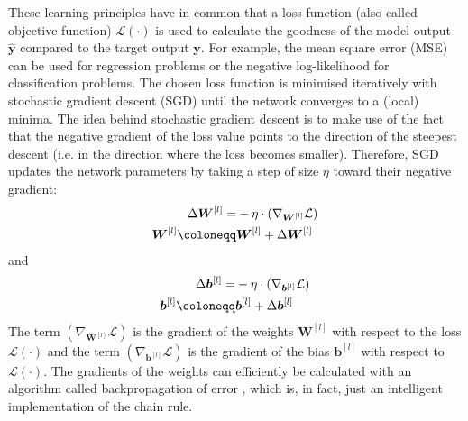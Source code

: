 These learning principles have in common that a loss function (also called objective function) $\mathcal{L}(\cdot)$ is used to calculate the goodness of the model output $\boldsymbol{\hat{y}}$ compared to the target output ${\boldsymbol{y}}$. For example, the mean square error (MSE) can be used for regression problems or the negative log-likelihood for classification problems.
The chosen loss function is minimised iteratively with stochastic gradient descent (SGD) until the network converges to a (local) minima.
The idea behind stochastic gradient descent is to make use of the fact that the negative gradient of the loss value points to the direction of the steepest descent (i.e. in the direction where the loss becomes smaller).
Therefore, SGD updates the network parameters by taking a step of size $\eta$ toward their negative gradient:
%
\begin{align}\eqlbl{sgd}
	\begin{aligned}
		\Delta \boldsymbol{W}^{[l]} = & -\eta \cdot \left( \nabla_{\boldsymbol{W}^{[l]}} \mathcal{L} \right)\\
		\boldsymbol{W}^{[l]} \coloneqq & \boldsymbol{W}^{[l]} + \Delta \boldsymbol{W}^{[l]}
	\end{aligned}
\end{align}
%
and
%	
\begin{align}\eqlbl{sgd2}	
	\begin{aligned}
		\Delta \boldsymbol{b}^{[l]} = & -\eta \cdot \left( \nabla_{\boldsymbol{b}^{[l]}} \mathcal{L} \right)\\
		\boldsymbol{b}^{[l]} \coloneqq & \boldsymbol{b}^{[l]} + \Delta \boldsymbol{b}^{[l]}
	\end{aligned}
\end{align}
%
The term $\left( \nabla_{\boldsymbol{W}^{[l]}} \mathcal{L} \right)$ is the gradient of the weights \(\boldsymbol{W}^{[l]}\)  with respect to the loss $\mathcal{L}(\cdot)$ and the term $\left( \nabla_{\boldsymbol{b}^{[l]}} \mathcal{L} \right)$ is the gradient of the bias \(\boldsymbol{b}^{[l]}\)  with respect to $\mathcal{L}(\cdot)$.
The gradients of the weights can efficiently be calculated with an algorithm called backpropagation of error , which is, in fact, just an intelligent implementation of the chain rule.

